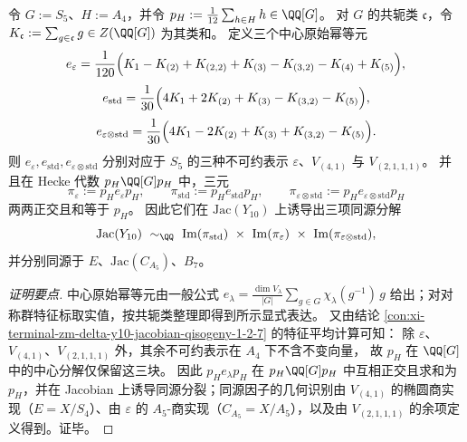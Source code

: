 \begin{conclusion}\label{con:xi-terminal-zm-delta-y10-hecke-idempotents-computable-projections}
令 \(G:=S_5\)、\(H:=A_4\)，并令 \(p_H:=\frac1{12}\sum_{h\in H}h\in\QQ[G]\)。
对 \(G\) 的共轭类 \(\mathfrak c\)，令 \(K_{\mathfrak c}:=\sum_{g\in \mathfrak c}g\in Z(\QQ[G])\) 为其类和。
定义三个中心原始幂等元
\[
e_{\varepsilon}=\frac1{120}\Bigl(K_{1}-K_{(2)}+K_{(2,2)}+K_{(3)}-K_{(3,2)}-K_{(4)}+K_{(5)}\Bigr),
\]
\[
e_{\mathrm{std}}=\frac1{30}\Bigl(4K_{1}+2K_{(2)}+K_{(3)}-K_{(3,2)}-K_{(5)}\Bigr),
\]
\[
e_{\varepsilon\otimes\mathrm{std}}=\frac1{30}\Bigl(4K_{1}-2K_{(2)}+K_{(3)}+K_{(3,2)}-K_{(5)}\Bigr).
\]
则 \(e_{\varepsilon},e_{\mathrm{std}},e_{\varepsilon\otimes\mathrm{std}}\) 分别对应于 \(S_5\) 的三种不可约表示
\(\varepsilon\)、\(V_{(4,1)}\) 与 \(V_{(2,1,1,1)}\)。
并且在 Hecke 代数 \(p_H\QQ[G]p_H\) 中，三元
\[
\pi_{\varepsilon}:=p_He_{\varepsilon}p_H,\qquad
\pi_{\mathrm{std}}:=p_He_{\mathrm{std}}p_H,\qquad
\pi_{\varepsilon\otimes\mathrm{std}}:=p_He_{\varepsilon\otimes\mathrm{std}}p_H
\]
两两正交且和等于 \(p_H\)。
因此它们在 \(\mathrm{Jac}(Y_{10})\) 上诱导出三项同源分解
\[
\mathrm{Jac}(Y_{10})
\ \sim_{\QQ}\
\mathrm{Im}(\pi_{\mathrm{std}})\ \times\ \mathrm{Im}(\pi_{\varepsilon})\ \times\ \mathrm{Im}(\pi_{\varepsilon\otimes\mathrm{std}}),
\]
并分别同源于 \(E\)、\(\mathrm{Jac}(C_{A_5})\)、\(B_7\)。
\end{conclusion}
\begin{proof}[证明要点]
中心原始幂等元由一般公式
\(
e_{\lambda}=\frac{\dim V_\lambda}{|G|}\sum_{g\in G}\chi_\lambda(g^{-1})\,g
\)
给出；对对称群特征标取实值，按共轭类整理即得到所示显式表达。
又由结论 \ref{con:xi-terminal-zm-delta-y10-jacobian-qisogeny-1-2-7} 的特征平均计算可知：
除 \(\varepsilon\)、\(V_{(4,1)}\)、\(V_{(2,1,1,1)}\) 外，其余不可约表示在 \(A_4\) 下不含不变向量，
故 \(p_H\) 在 \(\QQ[G]\) 中的中心分解仅保留这三块。
因此 \(p_H e_\lambda p_H\) 在 \(p_H\QQ[G]p_H\) 中互相正交且求和为 \(p_H\)，并在 Jacobian 上诱导同源分裂；同源因子的几何识别由 \(V_{(4,1)}\) 的椭圆商实现（\(E=X/S_4\)）、由 \(\varepsilon\) 的 \(A_5\)-商实现（\(C_{A_5}=X/A_5\)），以及由 \(V_{(2,1,1,1)}\) 的余项定义得到。证毕。
\end{proof}

